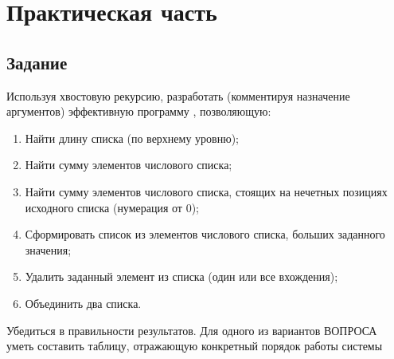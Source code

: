 \setcounter{page}{3}

\chapter{Практическая часть}
\section{Задание}
Используя хвостовую рекурсию, разработать (комментируя назначение
аргументов) эффективную программу , позволяющую:
\begin{enumerate}
	\item Найти длину списка (по верхнему уровню);
	\item Найти сумму элементов числового списка;
	\item Найти сумму элементов числового списка, стоящих на нечетных позициях исходного списка (нумерация от 0);
	\item Сформировать список из элементов числового списка, больших заданного значения;
	\item Удалить заданный элемент из списка (один или все вхождения);
	\item Объединить два списка.
\end{enumerate}

Убедиться в правильности результатов.
Для одного из вариантов ВОПРОСА уметь составить таблицу, отражающую конкретный порядок работы системы
  
